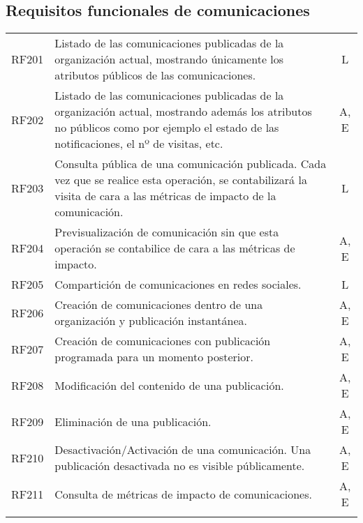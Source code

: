 \subsection{Requisitos funcionales de comunicaciones}
\begin{longtable}{lp{13cm}c}
  RF201\label{RF201} & Listado de las comunicaciones publicadas de la organización actual, mostrando únicamente los atributos públicos de las comunicaciones. & L \\
  RF202\label{RF202} & Listado de las comunicaciones publicadas de la organización actual, mostrando además los atributos no públicos como por ejemplo el estado de las notificaciones, el nº de visitas, etc. & A, E \\
  RF203\label{RF203} & Consulta pública de una comunicación publicada. Cada vez que se realice esta operación, se contabilizará la visita de cara a las métricas de impacto de la comunicación. & L \\
  RF204\label{RF203} & Previsualización de comunicación sin que esta operación se contabilice de cara a las métricas de impacto. & A, E \\
  RF205\label{RF205} & Compartición de comunicaciones en redes sociales. & L \\
  RF206\label{RF206} & Creación de comunicaciones dentro de una organización y publicación instantánea. & A, E \\
  RF207\label{RF207} & Creación de comunicaciones con publicación programada para un momento posterior. & A, E \\
  RF208\label{RF208} & Modificación del contenido de una publicación. & A, E \\
  RF209\label{RF209} & Eliminación de una publicación. & A, E \\
  RF210\label{RF210} & Desactivación/Activación de una comunicación. Una publicación desactivada no es visible públicamente. & A, E \\
  RF211\label{RF211} & Consulta de métricas de impacto de comunicaciones. & A, E \\
  \label{cuadro:requisitos-funcionales-de-comunicaciones}
\end{longtable}

